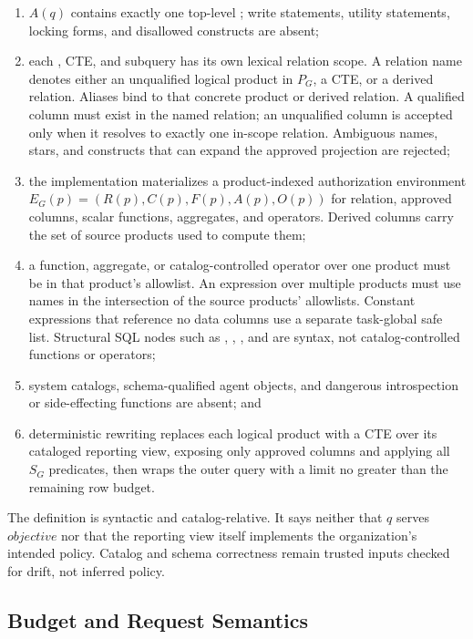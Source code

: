 \documentclass[10pt,journal,compsoc]{IEEEtran}
\newcommand{\code}[1]{\texttt{\detokenize{#1}}}
\begin{document}
\begin{enumerate}
  \item $A(q)$ contains exactly one top-level \code{SELECT}; write statements,
  utility statements, locking forms, and disallowed constructs are absent;
  \item each \code{SELECT}, CTE, and subquery has its own lexical relation
  scope.  A relation name denotes either an unqualified logical product in
  $P_G$, a CTE, or a derived relation.  Aliases bind to that concrete product
  or derived relation.  A qualified column must exist in the named relation;
  an unqualified column is accepted only when it resolves to exactly one
  in-scope relation.  Ambiguous names, stars, and constructs that can expand
  the approved projection are rejected;
  \item the implementation materializes a product-indexed authorization
  environment
  $E_G(p)=(R(p), C(p), F(p), A(p), O(p))$ for relation, approved columns,
  scalar functions, aggregates, and operators.  Derived columns carry the set
  of source products used to compute them;
  \item a function, aggregate, or catalog-controlled operator over one product
  must be in that product's allowlist.  An expression over multiple products
  must use names in the intersection of the source products' allowlists.
  Constant expressions that reference no data columns use a separate
  task-global safe list.  Structural SQL nodes such as \code{AND}, \code{OR},
  \code{NULL TEST}, and \code{CASE} are syntax, not catalog-controlled
  functions or operators;
  \item system catalogs, schema-qualified agent objects, and dangerous
  introspection or side-effecting functions are absent; and
  \item deterministic rewriting replaces each logical product with a CTE over
  its cataloged reporting view, exposing only approved columns and applying all
  $S_G$ predicates, then wraps the outer query with a limit no greater than the
  remaining row budget.
\end{enumerate}

The definition is syntactic and catalog-relative.  It says neither that $q$
serves $objective$ nor that the reporting view itself implements the
organization's intended policy.  Catalog and schema correctness remain trusted
inputs checked for drift, not inferred policy.

\subsection{Budget and Request Semantics}
\end{document}
